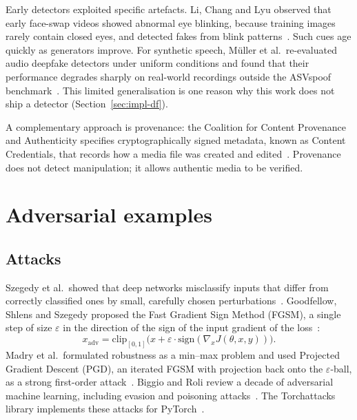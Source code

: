 Early detectors exploited specific artefacts. Li, Chang and Lyu observed that early face-swap videos showed abnormal eye blinking, because training images rarely contain closed eyes, and detected fakes from blink patterns~\cite{li2018ictu}. Such cues age quickly as generators improve. For synthetic speech, Müller et al.\ re-evaluated audio deepfake detectors under uniform conditions and found that their performance degrades sharply on real-world recordings outside the ASVspoof benchmark~\cite{muller2022audio}. This limited generalisation is one reason why this work does not ship a detector (Section~\ref{sec:impl-df}).

A complementary approach is provenance: the Coalition for Content Provenance and Authenticity specifies cryptographically signed metadata, known as Content Credentials, that records how a media file was created and edited~\cite{c2pa2spec}. Provenance does not detect manipulation; it allows authentic media to be verified.

\section{Adversarial examples}
\label{sec:sota-adv}

\subsection{Attacks}
Szegedy et al.\ showed that deep networks misclassify inputs that differ from correctly classified ones by small, carefully chosen perturbations~\cite{szegedy2014intriguing}. Goodfellow, Shlens and Szegedy proposed the Fast Gradient Sign Method (FGSM), a single step of size $\varepsilon$ in the direction of the sign of the input gradient of the loss~\cite{goodfellow2015explaining}:
\begin{equation}
x_{\mathrm{adv}} = \mathrm{clip}_{[0,1]}\bigl(x + \varepsilon \cdot \mathrm{sign}(\nabla_x J(\theta, x, y))\bigr).
\label{eq:fgsm}
\end{equation}
Madry et al.\ formulated robustness as a min--max problem and used Projected Gradient Descent (PGD), an iterated FGSM with projection back onto the $\varepsilon$-ball, as a strong first-order attack~\cite{madry2018towards}. Biggio and Roli review a decade of adversarial machine learning, including evasion and poisoning attacks~\cite{biggio2018wild}. The Torchattacks library implements these attacks for PyTorch~\cite{kim2020torchattacks}.

